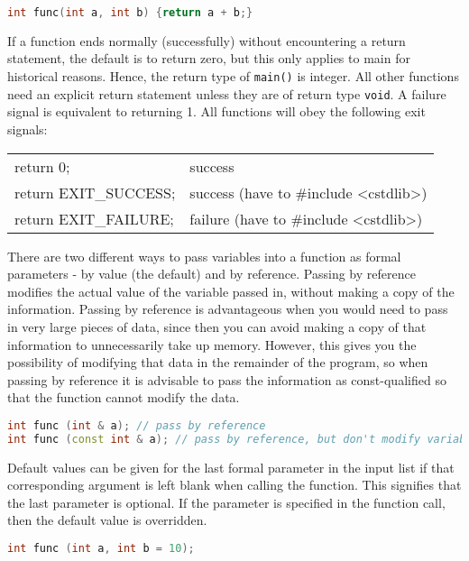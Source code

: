 \documentclass[10pt]{article}
\begin{document}
\begin{lstlisting}[language=C++]
int func(int a, int b) {return a + b;}
\end{lstlisting}

If a function ends normally (successfully) without encountering a return statement, the default is to return zero, but this only applies to main for historical reasons. Hence, the return type of \texttt{main()} is integer. All other functions need an explicit return statement unless they are of return type \texttt{void}. A failure signal is equivalent to returning 1. All functions will obey the following exit signals:

\begin{center}
\begin{tabular}{l l}
return 0; & success\\
return EXIT\_SUCCESS; & success (have to \#include \textless cstdlib\textgreater)\\
return EXIT\_FAILURE; & failure (have to \#include \textless cstdlib\textgreater)\\
\end{tabular}
\end{center}

There are two different ways to pass variables into a function as formal parameters - by value (the default) and by reference. Passing by reference modifies the actual value of the variable passed in, without making a copy of the information. Passing by reference is advantageous when you would need to pass in very large pieces of data, since then you can avoid making a copy of that information to unnecessarily take up memory. However, this gives you the possibility of modifying that data in the remainder of the program, so when passing by reference it is advisable to pass the information as const-qualified so that the function cannot modify the data.

\begin{lstlisting}[language=C++]
int func (int & a); // pass by reference
int func (const int & a); // pass by reference, but don't modify variable
\end{lstlisting}

Default values can be given for the last formal parameter in the input list if that corresponding argument is left blank when calling the function. This signifies that the last parameter is optional. If the parameter is specified in the function call, then the default value is overridden.

\begin{lstlisting}[language=C++]
int func (int a, int b = 10);
\end{lstlisting}
\end{document}
